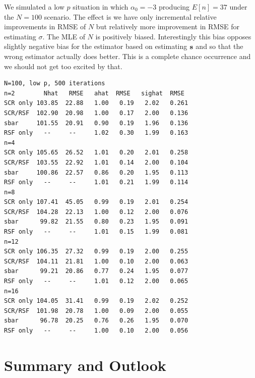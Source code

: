 We simulated a low $p$ situation in which $\alpha_{0}=-3$ producing
$E[n] = 37$ under the $N=100$ scenario.  The effect is we have only
incremental relative improvements in RMSE of $N$ but relatively more
improvement in RMSE for estimating $\sigma$. The MLE of
$N$ is positively biased.
Interestingly this bias opposes slightly negative bias for
the estimator based on estimating ${\bf s}$ and so that the wrong
estimator actually does better. This is a complete chance occurrence
and we should not get too excited by that.
{\small
\begin{verbatim}
N=100, low p, 500 iterations
n=2        Nhat   RMSE   ahat  RMSE   sighat  RMSE
SCR only 103.85  22.88   1.00   0.19   2.02   0.261
SCR/RSF  102.90  20.98   1.00   0.17   2.00   0.136
sbar     101.55  20.91   0.90   0.19   1.96   0.136
RSF only   --     --     1.02   0.30   1.99   0.163
n=4
SCR only 105.65  26.52   1.01   0.20   2.01   0.258
SCR/RSF  103.55  22.92   1.01   0.14   2.00   0.104
sbar     100.86  22.57   0.86   0.20   1.95   0.113
RSF only   --     --     1.01   0.21   1.99   0.114
n=8
SCR only 107.41  45.05   0.99   0.19   2.01   0.254
SCR/RSF  104.28  22.13   1.00   0.12   2.00   0.076
sbar      99.82  21.55   0.80   0.23   1.95   0.091
RSF only   --     --     1.01   0.15   1.99   0.081
n=12
SCR only 106.35  27.32   0.99   0.19   2.00   0.255
SCR/RSF  104.11  21.81   1.00   0.10   2.00   0.063
sbar      99.21  20.86   0.77   0.24   1.95   0.077
RSF only   --     --     1.01   0.12   2.00   0.065
n=16
SCR only 104.05  31.41   0.99   0.19   2.02   0.252
SCR/RSF  101.98  20.78   1.00   0.09   2.00   0.055
sbar      96.78  20.25   0.76   0.26   1.95   0.070
RSF only   --     --     1.00   0.10   2.00   0.056
\end{verbatim}
}



\section{Summary and Outlook}


